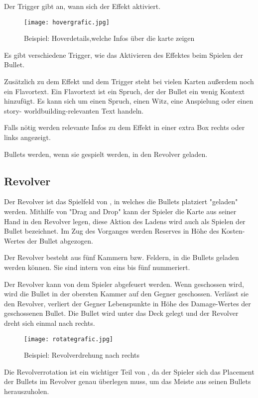 Der Trigger gibt an, wann sich der Effekt aktiviert.


\begin{figure}[H]
    \texttt{[image: hovergrafic.jpg]}
    \caption{Beispiel: Hoverdetails,welche Infos über die karte zeigen}
\end{figure}



Es gibt verschiedene Trigger, wie \zB das Aktivieren des Effektes beim Spielen der Bullet.


Zusätzlich zu dem Effekt und dem Trigger steht bei vielen Karten außerdem noch ein Flavortext.
Ein Flavortext ist ein Spruch, der der Bullet ein wenig Kontext hinzufügt.
Es kann sich um einen Spruch, einen Witz, eine Anspielung oder einen story- \bzw worldbuilding-relevanten Text handeln.


Falls nötig werden relevante Infos zu dem Effekt in einer extra Box rechts oder links angezeigt.


Bullets werden, wenn sie gespielt werden, in den Revolver geladen.


\subsection{Revolver}\label{der_revolver}

Der Revolver ist das Spielfeld von \FF, in welches die Bullets platziert \bzw "geladen" werden.
Mithilfe von "Drag and Drop" kann der Spieler die Karte aus seiner Hand in den Revolver legen, diese Aktion des Ladens wird auch als Spielen der Bullet bezeichnet.
Im Zug des Vorganges werden Reserves in Höhe des Kosten-Wertes der Bullet abgezogen.


Der Revolver besteht aus fünf Kammern bzw. Feldern, in die Bullets geladen werden können.
Sie sind intern von eins bis fünf nummeriert.


Der Revolver kann von dem Spieler abgefeuert werden. Wenn geschossen wird, wird die Bullet in der obersten Kammer auf den Gegner geschossen.
Verlässt sie den Revolver, verliert der Gegner Lebenspunkte in Höhe des Damage-Wertes der geschossenen Bullet.
Die Bullet wird unter das Deck gelegt und der Revolver dreht sich einmal nach rechts.

\begin{figure}[H]
    \texttt{[image: rotategrafic.jpg]}
    \caption{Beispiel: Revolverdrehung nach rechts}
\end{figure}


Die Revolverrotation ist ein wichtiger Teil von \FF, da der Spieler sich das Placement der Bullets im Revolver genau überlegen muss,
um das Meiste aus seinen Bullets herauszuholen.


